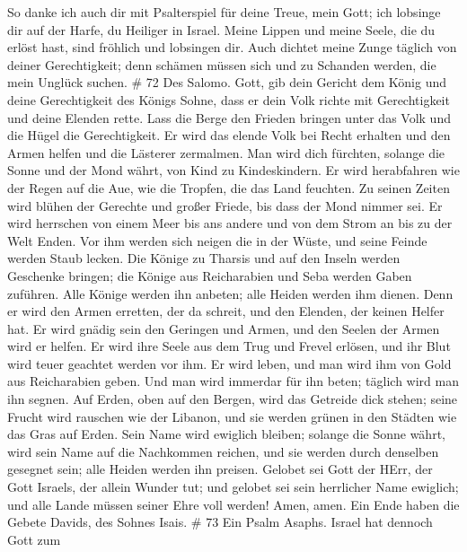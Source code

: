  So danke ich auch dir mit Psalterspiel für deine Treue,
mein Gott; ich lobsinge dir auf der Harfe, du Heiliger in Israel.
 Meine Lippen und meine Seele, die du erlöst hast, sind
fröhlich und lobsingen dir.  Auch dichtet meine Zunge
täglich von deiner Gerechtigkeit; denn schämen müssen sich und zu
Schanden werden, die mein Unglück suchen. \# 72  Des Salomo.
Gott, gib dein Gericht dem König und deine Gerechtigkeit des Königs
Sohne,  dass er dein Volk richte mit Gerechtigkeit und deine
Elenden rette.  Lass die Berge den Frieden bringen unter das
Volk und die Hügel die Gerechtigkeit.  Er wird das elende
Volk bei Recht erhalten und den Armen helfen und die Lästerer zermalmen.
 Man wird dich fürchten, solange die Sonne und der Mond
währt, von Kind zu Kindeskindern.  Er wird herabfahren wie
der Regen auf die Aue, wie die Tropfen, die das Land feuchten.
 Zu seinen Zeiten wird blühen der Gerechte und großer
Friede, bis dass der Mond nimmer sei.  Er wird herrschen von
einem Meer bis ans andere und von dem Strom an bis zu der Welt Enden.
 Vor ihm werden sich neigen die in der Wüste, und seine
Feinde werden Staub lecken.  Die Könige zu Tharsis und auf
den Inseln werden Geschenke bringen; die Könige aus Reicharabien und
Seba werden Gaben zuführen.  Alle Könige werden ihn
anbeten; alle Heiden werden ihm dienen.  Denn er wird den
Armen erretten, der da schreit, und den Elenden, der keinen Helfer hat.
 Er wird gnädig sein den Geringen und Armen, und den Seelen
der Armen wird er helfen.  Er wird ihre Seele aus dem Trug
und Frevel erlösen, und ihr Blut wird teuer geachtet werden vor ihm.
 Er wird leben, und man wird ihm von Gold aus Reicharabien
geben. Und man wird immerdar für ihn beten; täglich wird man ihn segnen.
 Auf Erden, oben auf den Bergen, wird das Getreide dick
stehen; seine Frucht wird rauschen wie der Libanon, und sie werden
grünen in den Städten wie das Gras auf Erden.  Sein Name
wird ewiglich bleiben; solange die Sonne währt, wird sein Name auf die
Nachkommen reichen, und sie werden durch denselben gesegnet sein; alle
Heiden werden ihn preisen.  Gelobet sei Gott der HErr, der
Gott Israels, der allein Wunder tut;  und gelobet sei sein
herrlicher Name ewiglich; und alle Lande müssen seiner Ehre voll werden!
Amen, amen.  Ein Ende haben die Gebete Davids, des Sohnes
Isais. \# 73  Ein Psalm Asaphs. Israel hat dennoch Gott zum
